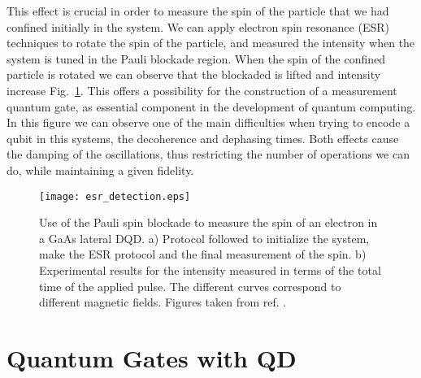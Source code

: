 This effect is crucial in order to measure the spin of the particle that we had confined initially in the system. We can apply electron spin resonance (ESR) techniques to rotate the spin of the particle, and measured the intensity when the system  is tuned in the Pauli blockade region. When the spin of the confined particle is rotated we can observe that the blockaded is lifted and intensity increase Fig.~\ref{fig:esr_detection}. This offers a possibility for the construction of a measurement quantum gate, as essential component in the development of quantum computing. In this figure we can observe one of the main difficulties when trying to encode a qubit in this systems, the decoherence and dephasing times. Both effects cause the damping  of the oscillations, thus restricting the number of operations we can do, while maintaining a given fidelity.
\begin{figure}[!htb]
	\centering
	\texttt{[image: esr\_detection.eps]}
	\caption{Use of the Pauli spin blockade to measure the spin of an electron in a GaAs lateral DQD. a) Protocol followed to initialize the system, make the ESR protocol and the final measurement of the spin. b) Experimental results for the intensity measured in terms of the total time of the applied pulse. The different curves correspond to different magnetic fields. Figures taken from ref. \cite{Koppens2006}.}
	\label{fig:esr_detection}
\end{figure}

\section{Quantum Gates with QD}

